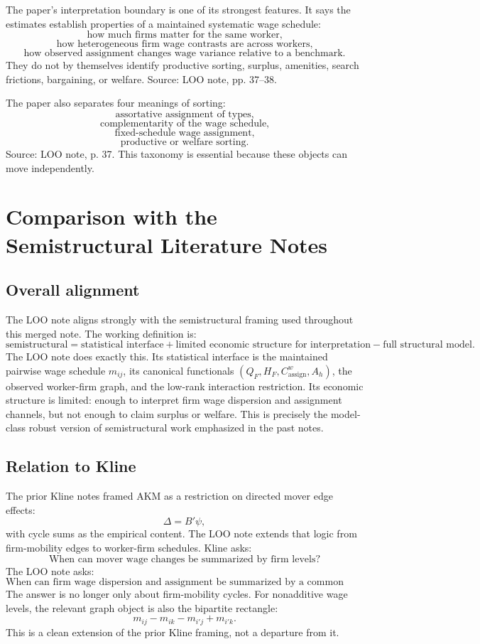 \documentclass[11pt]{article}
\begin{document}
The paper's interpretation boundary is one of its strongest features. It says
the estimates establish properties of a maintained systematic wage schedule:
\[
\text{how much firms matter for the same worker,}
\]
\[
\text{how heterogeneous firm wage contrasts are across workers,}
\]
\[
\text{how observed assignment changes wage variance relative to a benchmark.}
\]
They do not by themselves identify productive sorting, surplus, amenities,
search frictions, bargaining, or welfare. Source: LOO note, pp. 37--38.

The paper also separates four meanings of sorting:
\[
\text{assortative assignment of types,}
\]
\[
\text{complementarity of the wage schedule,}
\]
\[
\text{fixed-schedule wage assignment,}
\]
\[
\text{productive or welfare sorting.}
\]
Source: LOO note, p. 37. This taxonomy is essential because these objects can
move independently.

\section{Comparison with the Semistructural Literature Notes}

\subsection{Overall alignment}

The LOO note aligns strongly with the semistructural framing used throughout this
merged note. The working definition is:
\[
\text{semistructural}
=
\text{statistical interface}
+
\text{limited economic structure for interpretation}
-
\text{full structural model}.
\]
The LOO note does exactly this. Its statistical interface is the maintained
pairwise wage schedule \(m_{ij}\), its canonical functionals
\((Q_F,H_F,C^w_{\mathrm{assign}},A_h)\), the observed worker-firm graph, and the
low-rank interaction restriction. Its economic structure is limited: enough to
interpret firm wage dispersion and assignment channels, but not enough to claim
surplus or welfare. This is precisely the model-class robust version of
semistructural work emphasized in the past notes.

\subsection{Relation to Kline}

The prior Kline notes framed AKM as a restriction on directed mover edge effects:
\[
\Delta=B'\psi,
\]
with cycle sums as the empirical content. The LOO note extends that logic from
firm-mobility edges to worker-firm schedules. Kline asks:
\[
\text{When can mover wage changes be summarized by firm levels?}
\]
The LOO note asks:
\[
\text{When can firm wage dispersion and assignment be summarized by a common
firm ladder?}
\]
The answer is no longer only about firm-mobility cycles. For nonadditive wage
levels, the relevant graph object is also the bipartite rectangle:
\[
m_{ij}-m_{ik}-m_{i'j}+m_{i'k}.
\]
This is a clean extension of the prior Kline framing, not a departure from it.
\end{document}
